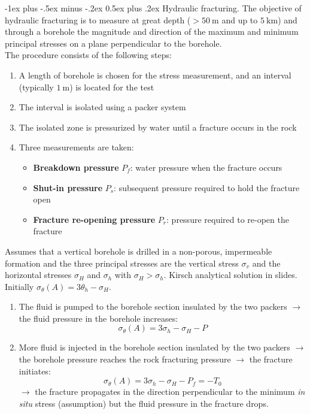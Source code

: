 \documentclass[10pt,landscape,a4paper]{article}
\makeatletter
\renewcommand{\section}{\@startsection{section}{1}{0mm}%
	{-1ex plus -.5ex minus -.2ex}%
	{0.5ex plus .2ex}%
	{\normalfont\large\bfseries}}
\makeatother
\begin{document}
\begin{multicols}{3}
	\section{Hydraulic fracturing.}
	The objective of hydraulic fracturing is to measure at great depth ($>50\SI{}{\meter}$ and up to $\SI{5}{\kilo\meter}$) and through a borehole the magnitude and direction of the maximum and minimum principal stresses on a plane perpendicular to the borehole.\\
	The procedure consists of the following steps:
	\begin{enumerate}
		\item A length of borehole is chosen for the stress measurement, and an interval (typically $\SI{1}{\meter}$) is located for the test
		\item The interval is isolated using a packer system
		\item The isolated zone is pressurized by water until a fracture occurs in the rock
		\item Three measurements are taken:
		      \begin{itemize}
			      \item \textbf{Breakdown pressure} $P_f$: water pressure when the fracture occurs
			      \item \textbf{Shut-in pressure} $P_s$: subsequent pressure required to hold the fracture open
			      \item \textbf{Fracture re-opening pressure} $P_r$: pressure required to re-open the fracture
		      \end{itemize}
	\end{enumerate}
	Assumes that a vertical borehole is drilled in a non-porous, impermeable formation and the three principal stresses are the vertical stress $\sigma_v$ and the horizontal stresses $\sigma_H$ and $\sigma_h$ with $\sigma_H>\sigma_h$.
	Kirsch analytical solution in slides.
	Initially $\sigma_\theta(A)=3\theta_h-\sigma_H$.
	\begin{enumerate}
		\item The fluid is pumped to the borehole section insulated by the two packers $\to$ the fluid pressure in the borehole increases:
		      \[
			      \sigma_\theta(A)=3\sigma_h-\sigma_H-P
		      \]
		\item More fluid is injected in the borehole section insulated by the two packers $\to$ the borehole pressure reaches the rock fracturing pressure $\to$ the fracture initiates:
		      \[
			      \sigma_\theta(A)=3\sigma_h-\sigma_H-P_f=-T_0
		      \]
		      $\to$ the fracture propagates in the direction perpendicular to the minimum \textit{in situ} stress (assumption) but the fluid pressure in the fracture drops.

\end{enumerate}
\end{multicols}
\end{document}

